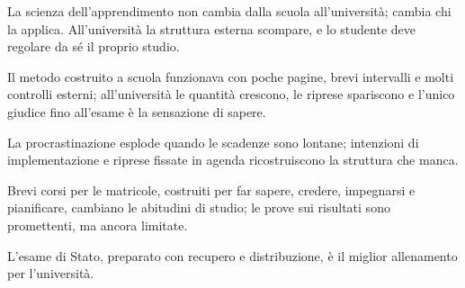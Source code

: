 \begin{sintesi}
  \item La scienza dell'apprendimento non cambia dalla scuola
        all'università; cambia chi la applica. All'università la
        struttura esterna scompare, e lo studente deve regolare da sé
        il proprio studio.
  \item Il metodo costruito a scuola funzionava con poche pagine, brevi
        intervalli e molti controlli esterni; all'università le
        quantità crescono, le riprese spariscono e l'unico giudice fino
        all'esame è la sensazione di sapere.
  \item La procrastinazione esplode quando le scadenze sono lontane;
        intenzioni di implementazione e riprese fissate in agenda
        ricostruiscono la struttura che manca.
  \item Brevi corsi per le matricole, costruiti per far sapere,
        credere, impegnarsi e pianificare, cambiano le abitudini di
        studio; le prove sui risultati sono promettenti, ma ancora
        limitate.
  \item L'esame di Stato, preparato con recupero e distribuzione, è
        il miglior allenamento per l'università.
\end{sintesi}

\finecapitolo
